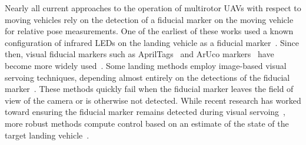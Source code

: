 Nearly all current approaches to the operation of multirotor UAVs with respect to moving
vehicles rely on the
detection of a fiducial marker on the moving vehicle for relative pose
measurements. One of the earliest of these works
used a known configuration of infrared LEDs on the landing vehicle as a fiducial
marker~\cite{wenzel2011automatic}.
Since then, visual fiducial markers such as
AprilTags~\cite{olson2011tags} and ArUco markers~\cite{garrido2016generation}
have become more widely
used~\cite{ling2014precision,borowczyk2017autonomous,marantos2018vision,
araar2017vision}.
Some landing methods employ image-based visual servoing techniques, depending
almost entirely on the detections of the fiducial
marker~\cite{lee2012autonomous,wynn2019visual}. These methods quickly fail when
the fiducial marker leaves the field of view of the camera or is otherwise not
detected. While recent research has worked toward ensuring the fiducial marker
remains detected during visual servoing~\cite{zheng2019towards}, more robust
methods compute control based on an estimate of the state of the target landing
vehicle~\cite{ling2014precision}.



